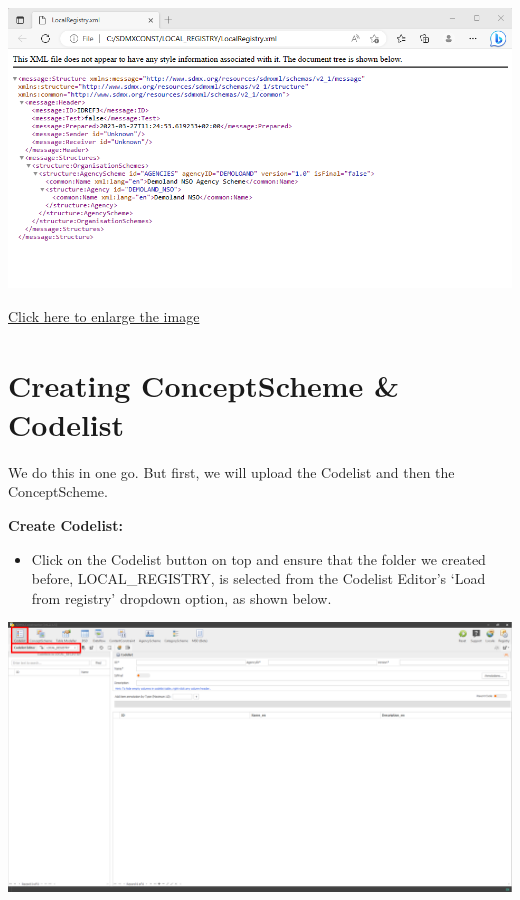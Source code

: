\documentclass[
]{book}
\providecommand{\tightlist}{%
  \setlength{\itemsep}{0pt}\setlength{\parskip}{0pt}}
\begin{document}
\begin{center}\includegraphics[width=1\linewidth]{./images/image080} \end{center}

\href{images/image080.png}{Click here to enlarge the image}

\hypertarget{creating-conceptscheme}{%
\section{Creating ConceptScheme \& Codelist}\label{creating-conceptscheme}}

We do this in one go. But first, we will upload the Codelist and then the ConceptScheme.

\textbf{Create Codelist:}

\begin{itemize}
\tightlist
\item
  Click on the Codelist button on top and ensure that the folder we created before, LOCAL\_REGISTRY, is selected from the Codelist Editor's `Load from registry' dropdown option, as shown below.
\end{itemize}

\begin{center}\includegraphics[width=1\linewidth]{./images/image082} \end{center}
\end{document}
